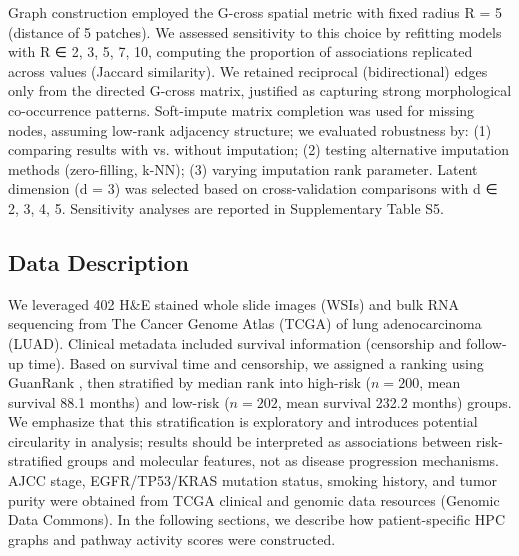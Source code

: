 \documentclass[pdflatex,article,12pt]{article}
\begin{document}
Graph construction employed the G-cross spatial metric with fixed radius R = 5 (distance of 5 patches). We assessed sensitivity to this choice by refitting models with R ∈ {2, 3, 5, 7, 10}, computing the proportion of associations replicated across values (Jaccard similarity). We retained reciprocal (bidirectional) edges only from the directed G-cross matrix, justified as capturing strong morphological co-occurrence patterns. Soft-impute matrix completion was used for missing nodes, assuming low-rank adjacency structure; we evaluated robustness by: (1) comparing results with vs. without imputation; (2) testing alternative imputation methods (zero-filling, k-NN); (3) varying imputation rank parameter. Latent dimension (d = 3) was selected based on cross-validation comparisons with d ∈ {2, 3, 4, 5}. Sensitivity analyses are reported in Supplementary Table S5.

\subsection{Data Description}\label{ssec: data description}

We leveraged 402 H\&E stained whole slide images (WSIs) and bulk RNA sequencing from The Cancer Genome Atlas (TCGA) of lung adenocarcinoma (LUAD). Clinical metadata included survival information (censorship and follow-up time). Based on survival time and censorship, we assigned a ranking using GuanRank \cite{huang2017complete}, then stratified by median rank into high-risk ($n = 200$, mean survival 88.1 months) and low-risk ($n = 202$, mean survival 232.2 months) groups. We emphasize that this stratification is exploratory and introduces potential circularity in analysis; results should be interpreted as associations between risk-stratified groups and molecular features, not as disease progression mechanisms. AJCC stage, EGFR/TP53/KRAS mutation status, smoking history, and tumor purity were obtained from TCGA clinical and genomic data resources (Genomic Data Commons). In the following sections, we describe how patient-specific HPC graphs and pathway activity scores were constructed.
\end{document}
